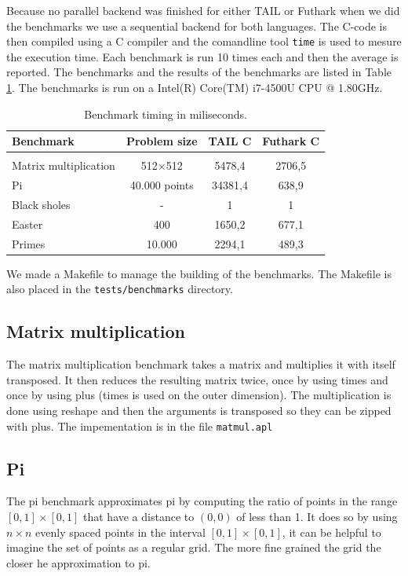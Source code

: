 \documentclass[11pt]{article}
\begin{document}
Because no parallel backend was finished for either TAIL or Futhark when we did the benchmarks we use a sequential backend for both languages. 
The C-code is then compiled using a C compiler and the comandline tool {\tt time} is used to mesure the execution time. Each benchmark is run 10 times each and then the average is reported. The benchmarks and the results of the benchmarks are listed in Table \ref{tbl:benchmark}.
The benchmarks is run on a Intel(R) Core(TM) i7-4500U CPU @ 1.80GHz. 

\begin{table}[h]
\begin{center}
\begin{tabular}{l c c c}
Benchmark & Problem size & TAIL C & Futhark C \\ \hline \\
Matrix multiplication    & 512$\times$512 &  5478,4     & 2706,5  \\
Pi		     	         & 40.000 points     &  34381,4   & 638,9 \\
Black sholes               & - 			    & 1               & 1 \\
Easter                         & 400 		    & 1650,2      & 677,1 \\
Primes                        & 10.000                & 2294,1      & 489,3 \\
\end{tabular}
\caption{Benchmark timing in miliseconds.}
\label{tbl:benchmark}
\end{center}
\end{table}

We made a Makefile to manage the building of the benchmarks. The Makefile is also placed in the {\tt tests/benchmarks} directory.


\subsection{Matrix multiplication}
The matrix multiplication benchmark takes a matrix and multiplies it with itself transposed.
It then reduces the resulting matrix twice, once by using times and once by using plus (times is used on the outer dimension).
The multiplication is done using reshape and then the arguments is transposed so they can be zipped with plus.
The impementation is in the file {\tt matmul.apl}

\subsection{Pi}
The pi benchmark approximates pi by computing the ratio of points in the range $[0,1] \times [0,1]$ that have a distance to $(0,0)$ of less than 1.
It does so by using $n \times n$ evenly spaced points in the interval $[0,1] \times [0,1]$, it can be helpful to imagine the set of points as a regular grid.
The more fine grained the grid the closer he approximation to pi.
\end{document}
